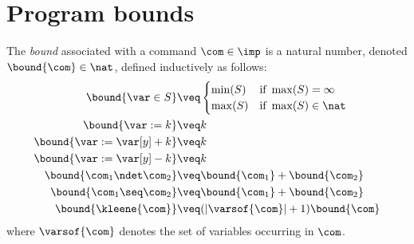 \section{Program bounds}
\label{sec:bounds}

\begin{definition}
  \label{de:bound}
  The \emph{bound} associated with a command \(\com\in \imp\) is a
  natural number, denoted \(\bound{\com}\in \nat\), defined
  inductively as follows:
  \begin{align*}
    \bound{\var \in S}  
    & \veq \begin{cases}
      \min(S) & \text{if } \max(S)=\infty\\
      \max(S) & \text{if } \max(S)\in \nat
    \end{cases}
    \\
    \bound{\var := k} 
    & \veq k\\
    \bound{\var := \var[y] + k}
    & \veq k\\
    \bound{\var := \var[y] - k}
    & \veq k\\
    \bound{\com_1 \ndet \com_2}
    & \veq \bound{\com_1} + \bound{\com_2}\\
    \bound{\com_1 \seq \com_2}
    & \veq \bound{\com_1} + \bound{\com_2}\\
    \bound{\kleene{\com}}
    & \veq (|\varsof{\com}|+1) \bound{\com} \\ 
  \end{align*}
  where \(\varsof{\com}\) denotes the set of variables occurring in 
  \(\com\).
\end{definition}

